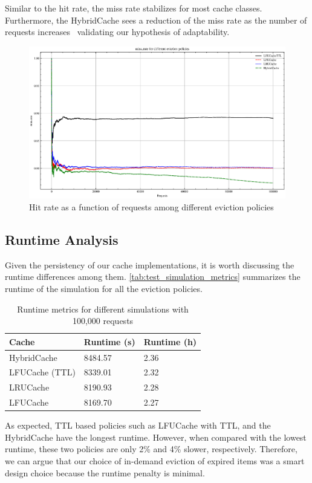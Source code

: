 Similar to the hit rate, the miss rate stabilizes
for most cache classes. Furthermore, the HybridCache
sees a reduction of the miss rate as the
number of requests increases \textemdash~validating
our hypothesis of adaptability.

\begin{figure}[!htp]
    \centering
    \includegraphics[width=\textwidth]{images/miss_rate_plot.eps} %
    \caption{Hit rate as a function of requests among different eviction policies}
    \label{fig:miss_rate_plot}
\end{figure}

\subsection{Runtime Analysis}
Given the persistency of our cache implementations,
it is worth discussing the runtime differences among
them. \autoref{tab:test_simulation_metrics} summarizes
the runtime of the simulation for all the eviction policies.

\begin{table}[!htp]
    \centering
    \caption{Runtime metrics for different simulations with 100,000 requests}
    \label{tab:test_simulation_metrics}
    \begin{tabularx}{\linewidth}{XXX}
        \toprule
        \textbf{Cache} & \textbf{Runtime (s)} & \textbf{Runtime (h)} \\
        \midrule
        HybridCache & 8484.57 & 2.36 \\
        LFUCache (TTL) & 8339.01 & 2.32 \\
        LRUCache & 8190.93 & 2.28 \\
        LFUCache & 8169.70 & 2.27 \\
        \bottomrule
    \end{tabularx}
\end{table}

As expected, TTL based policies such as LFUCache with TTL,
and the HybridCache have the longest runtime. However,
when compared with the lowest runtime, these two
policies are only 2\% and 4\% slower, respectively.
Therefore, we can argue that our choice of in-demand
eviction of expired items was a smart design choice
because the runtime penalty is minimal.